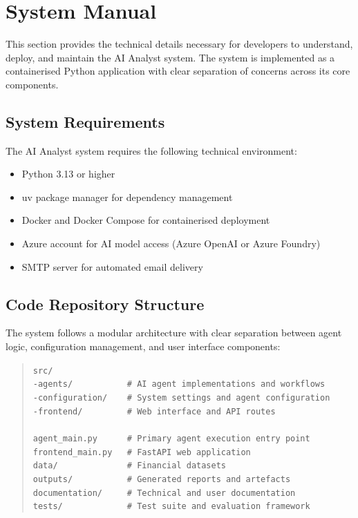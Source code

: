 \documentclass[a4paper]{report}
\begin{document}
\appendix

\printbibliography


\chapter{System Manual}
\label{chapter:system-manual}

This section provides the technical details necessary for developers to understand, deploy, and maintain the AI Analyst system. The system is implemented as a containerised Python application with clear separation of concerns across its core components.

\section{System Requirements}

The AI Analyst system requires the following technical environment:

\begin{itemize}
    \item Python 3.13 or higher
    \item uv package manager for dependency management
    \item Docker and Docker Compose for containerised deployment
    \item Azure account for AI model access (Azure OpenAI or Azure Foundry)
    \item SMTP server for automated email delivery
\end{itemize}

\section{Code Repository Structure}

The system follows a modular architecture with clear separation between agent logic, configuration management, and user interface components:

\begin{quote}
\texttt{src/}\\
\texttt{-agents/~~~~~~~~~~~\# AI agent implementations and workflows}\\
\texttt{-configuration/~~~~\# System settings and agent configuration}\\
\texttt{-frontend/~~~~~~~~~\# Web interface and API routes}\\
\\
\texttt{agent\_main.py~~~~~~\# Primary agent execution entry point}\\
\texttt{frontend\_main.py~~~\# FastAPI web application}\\
\texttt{data/~~~~~~~~~~~~~~\# Financial datasets}\\
\texttt{outputs/~~~~~~~~~~~\# Generated reports and artefacts}\\
\texttt{documentation/~~~~~\# Technical and user documentation}\\
\texttt{tests/~~~~~~~~~~~~~\# Test suite and evaluation framework}
\end{quote}
\end{document}
